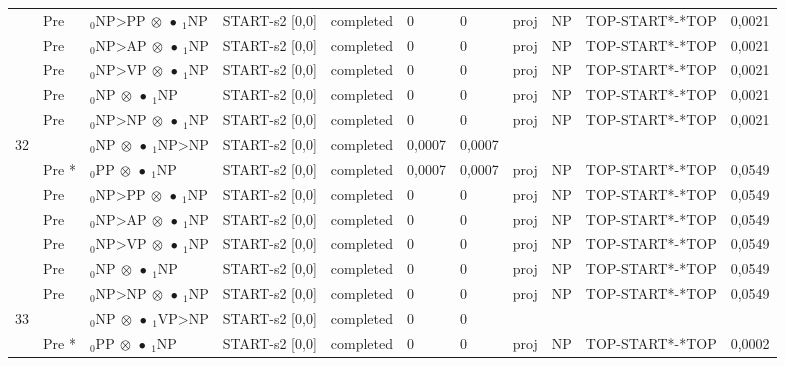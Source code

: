 \documentclass[10pt]{article}
\begin{document}
\begin{longtable}[htbp]{lllllllllll}
 & Pre & $ {}_0 \textrm{NP>PP} \  \otimes \  \bullet \ {}_{1} \textrm{NP} $ & START-s2 [0,0] & completed & 0 & 0 & proj & NP & TOP-START*-*TOP & 0,0021 \\ 
 & Pre & $ {}_0 \textrm{NP>AP} \  \otimes \  \bullet \ {}_{1} \textrm{NP} $ & START-s2 [0,0] & completed & 0 & 0 & proj & NP & TOP-START*-*TOP & 0,0021 \\ 
 & Pre & $ {}_0 \textrm{NP>VP} \  \otimes \  \bullet \ {}_{1} \textrm{NP} $ & START-s2 [0,0] & completed & 0 & 0 & proj & NP & TOP-START*-*TOP & 0,0021 \\ 
 & Pre & $ {}_0 \textrm{NP} \  \otimes \  \bullet \ {}_{1} \textrm{NP} $ & START-s2 [0,0] & completed & 0 & 0 & proj & NP & TOP-START*-*TOP & 0,0021 \\ 
 & Pre & $ {}_0 \textrm{NP>NP} \  \otimes \  \bullet \ {}_{1} \textrm{NP} $ & START-s2 [0,0] & completed & 0 & 0 & proj & NP & TOP-START*-*TOP & 0,0021 \\ 
32 & & $ {}_0 \textrm{NP} \  \otimes \  \bullet \ {}_{1} \textrm{NP>NP} $ & START-s2 [0,0] & completed & 0,0007 & 0,0007 & & & & \\ 
 & Pre *& $ {}_0 \textrm{PP} \  \otimes \  \bullet \ {}_{1} \textrm{NP} $ & START-s2 [0,0] & completed & 0,0007 & 0,0007 & proj & NP & TOP-START*-*TOP & 0,0549 \\ 
 & Pre & $ {}_0 \textrm{NP>PP} \  \otimes \  \bullet \ {}_{1} \textrm{NP} $ & START-s2 [0,0] & completed & 0 & 0 & proj & NP & TOP-START*-*TOP & 0,0549 \\ 
 & Pre & $ {}_0 \textrm{NP>AP} \  \otimes \  \bullet \ {}_{1} \textrm{NP} $ & START-s2 [0,0] & completed & 0 & 0 & proj & NP & TOP-START*-*TOP & 0,0549 \\ 
 & Pre & $ {}_0 \textrm{NP>VP} \  \otimes \  \bullet \ {}_{1} \textrm{NP} $ & START-s2 [0,0] & completed & 0 & 0 & proj & NP & TOP-START*-*TOP & 0,0549 \\ 
 & Pre & $ {}_0 \textrm{NP} \  \otimes \  \bullet \ {}_{1} \textrm{NP} $ & START-s2 [0,0] & completed & 0 & 0 & proj & NP & TOP-START*-*TOP & 0,0549 \\ 
 & Pre & $ {}_0 \textrm{NP>NP} \  \otimes \  \bullet \ {}_{1} \textrm{NP} $ & START-s2 [0,0] & completed & 0 & 0 & proj & NP & TOP-START*-*TOP & 0,0549 \\ 
33 & & $ {}_0 \textrm{NP} \  \otimes \  \bullet \ {}_{1} \textrm{VP>NP} $ & START-s2 [0,0] & completed & 0 & 0 & & & & \\ 
 & Pre *& $ {}_0 \textrm{PP} \  \otimes \  \bullet \ {}_{1} \textrm{NP} $ & START-s2 [0,0] & completed & 0 & 0 & proj & NP & TOP-START*-*TOP & 0,0002 \\ 

\end{longtable}
\end{document}
